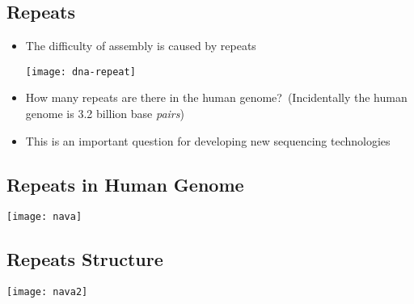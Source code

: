 \begin{slide}
\section[-1]{Repeats}

\begin{PauseHighLight}
  \begin{itemize}
  \item The difficulty of assembly is caused by repeats\pause
    \begin{center}
      \texttt{[image: dna-repeat]}
    \end{center}
  \item How many repeats are there in the human genome?\pause\
    (Incidentally the human genome is 3.2 billion base \emph{pairs})\pauseb
  \item This is an important question for developing new sequencing
    technologies\pause
  \end{itemize}
\end{PauseHighLight}

\end{slide}


\begin{slide}
\section[-2]{Repeats in Human Genome}

\begin{center}
  \texttt{[image: nava]}
\end{center}
\end{slide}


\begin{slide}
\section[-2]{Repeats Structure}

\begin{center}
  \texttt{[image: nava2]}
\end{center}
\end{slide}


